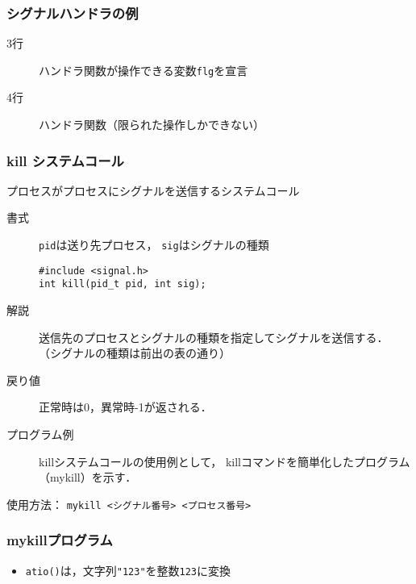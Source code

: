 \documentclass{beamer}                 %
\begin{document}
\begin{frame}[fragile]
  \frametitle{シグナルハンドラの例}
  \begin{quote}
  \end{quote}

  \begin{description}
  \item[3行] ハンドラ関数が操作できる変数\texttt{flg}を宣言
  \item[4行] ハンドラ関数（限られた操作しかできない）
  \end{description}
\end{frame}

\begin{frame}[fragile]
  \frametitle{kill システムコール}
  プロセスがプロセスにシグナルを送信するシステムコール

  \begin{description}
  \item[書式] \texttt{pid}は送り先プロセス，
    \texttt{sig}はシグナルの種類

\begin{verbatim}
#include <signal.h>
int kill(pid_t pid, int sig);
\end{verbatim}

  \item[解説]
    送信先のプロセスとシグナルの種類を指定してシグナルを送信する．
    （シグナルの種類は前出の表の通り）

  \item[戻り値]
    正常時は0，異常時-1が返される．

  \item[プログラム例]
    killシステムコールの使用例として，
    killコマンドを簡単化したプログラム（mykill）を示す．\\
  \end{description}
  \begin{center}
    使用方法： \texttt{mykill <シグナル番号> <プロセス番号>}
  \end{center}
\end{frame}

\begin{frame}[fragile]
  \frametitle{mykillプログラム}
  \begin{quote}
  \end{quote}

  \begin{itemize}
  \item \texttt{atio()}は，文字列\texttt{"123"}を整数\texttt{123}に変換
  \end{itemize}
\end{frame}
\end{document}
